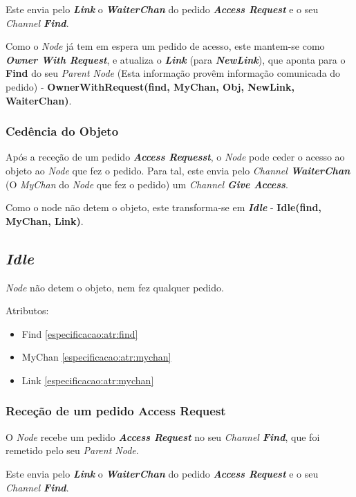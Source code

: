 Este envia pelo \textbf{\emph{Link}} o \textbf{\emph{WaiterChan}} do pedido \emph{\textbf{Access Request}} e o seu \emph{Channel \textbf{Find}}.

Como o \emph{Node} já tem em espera um pedido de acesso, este mantem-se como \emph{\textbf{Owner With Request}}, e atualiza o \textbf{\emph{Link}} (para \textbf{\emph{NewLink}}), que aponta para o \textbf{Find} do seu \emph{Parent Node} (Esta informação provêm informação comunicada do pedido) - \textbf{OwnerWithRequest(find, MyChan, Obj, NewLink, WaiterChan)}.


\subsubsection{Cedência do Objeto}
Após a receção de um pedido \emph{\textbf{Access Requesst}}, o \emph{Node} pode ceder o acesso ao objeto ao \emph{Node} que fez o pedido.
Para tal, este envia pelo \emph{Channel \textbf{WaiterChan}} (O \emph{MyChan} do \emph{Node} que fez o pedido) um \emph{Channel \textbf{Give Access}}.

Como o node não detem o objeto, este transforma-se em \emph{\textbf{Idle}} - \textbf{Idle(find, MyChan, Link)}.





\subsection{\emph{Idle}}
\label{especificacao:nodes:idle}

\emph{Node} não detem o objeto, nem fez qualquer pedido. 

Atributos:
\begin{itemize}
    \item Find \ref{especificacao:atr:find} 
    \item MyChan \ref{especificacao:atr:mychan} 
    \item Link \ref{especificacao:atr:mychan}  
\end{itemize}

\subsubsection{Receção de um pedido Access Request}
O \emph{Node} recebe um pedido \emph{\textbf{Access Request}} no seu \emph{Channel \textbf{Find}}, que foi remetido pelo seu \emph{Parent Node}.

Este envia pelo \textbf{\emph{Link}} o \textbf{\emph{WaiterChan}} do pedido \emph{\textbf{Access Request}} e o seu \emph{Channel \textbf{Find}}.

